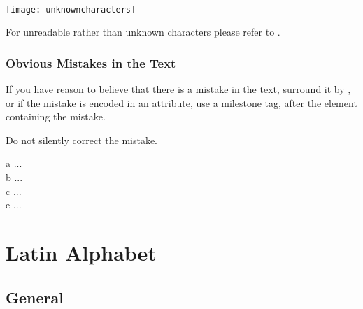\parbox{\linewidth}{{} \\[3mm] \texttt{[image: unknowncharacters]}}


\begin{crossref}
For unreadable rather than unknown characters please refer to .
\end{crossref}

\subsubsection{Obvious Mistakes in the Text}
\label{section obvious mistakes}

\begin{mainrule}
If you have reason to believe that there is a mistake in the text, surround it by , or if the mistake is encoded in an attribute, use a milestone tag,  after the element containing the mistake.
\end{mainrule}

\begin{clarification}
Do not silently correct the mistake.
\end{clarification}

\vspace{3mm}
\begin{example}

\vspace{-5mm}
\begin{typeLatin}
 a ...  \\
 b ...  \\
 c ...  \\
 e ...  \\
\end{typeLatin}
\end{example}


\section{Latin Alphabet}

\tocspace
\subsection{General}
\label{section latin general}


